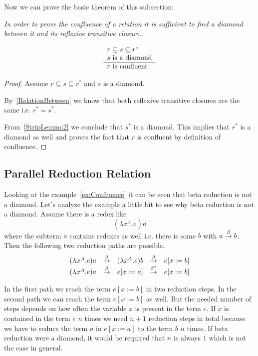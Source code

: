 Now we can prove the basic theorem of this subsection:

\begin{theorem}
    \label{DiamondBetween}
    \emph{In order to prove the confluence of a relation it is sufficient to
    find a diamond between it and its reflexive transitive closure.}.

    $$
    \begin{array}{l} 
        r \subseteq s \subseteq r^*
        \\
        s \text{ is a diamond}
     \\ \hline 
        r \text{ is confluent}
    \end{array}
    $$

    \begin{proof}
        Assume $r \subseteq s \subseteq r^*$ and $s$ is a diamond.

        By~\ref{RelationBetween} we know that both reflexive transitive closures
        are the same i.e. $r^* = s^*$.

        From~\ref{StripLemma2} we conclude that $s^*$ is a diamond. This implies
        that $r^*$ is a diamond as well and proves the fact that $r$ is
        confluent by definition of confluence.
    \end{proof}
\end{theorem}










\subsection{Parallel Reduction Relation}

Looking at the example~\ref{ex:Confluence} it can be seen that beta reduction is
not a diamond. Let's analyze the example a little bit to see why beta reduction
is not a diamond. Assume there is a redex like
$$
    (\lambda x^A. e) a
$$
where the subterm $a$ contains redexes as well i.e. there is some $b$ with $a
\stackrel{\beta}{\to} b$. Then the following two reduction paths are possible.
$$
\begin{array}{lllll}
    (\lambda x^A. e) a
    &\stackrel{\beta}{\to}& (\lambda x^A. e) b
    &\stackrel{\beta}{\to}& e[x:=b]
    \\
    (\lambda x^A. e) a
    &\stackrel{\beta}{\to}& e[x:=a]
    &\stackrel{\beta^*}{\to}& e[x:=b]
\end{array}
$$

In the first path we reach the term $e[x:=b]$ in two reduction steps. In the
second path we can reach the term $e[x:=b]$ as well. But the needed number of
steps depends on how often the variable $x$ is present in the term $e$. If $x$
is contained in the term $e$ $n$ times we need $n+1$ reduction steps in total
because we have to reduce the term $a$ in $e[x:=a]$ to the term $b$ $n$ times.
If beta reduction were a diamond, it would be required that $n$ is always $1$
which is not the case in general.

